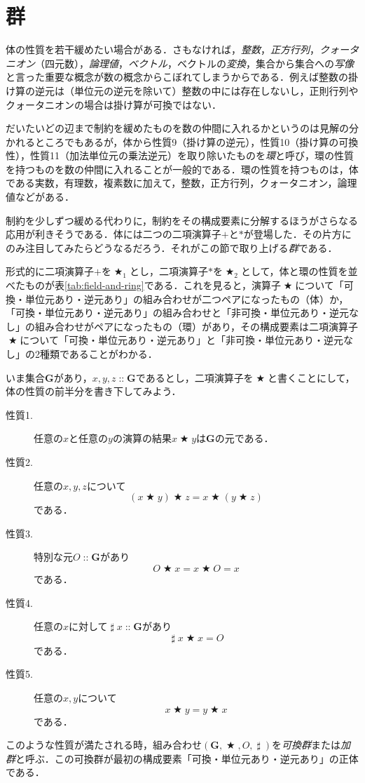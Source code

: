 \documentclass[twocolumn]{jsbook}
\newcommand{\keyword}[1]{{\emph{#1}}}
\DeclareMathOperator{\mathAnyBinaryOperator}{\bigstar}
\DeclareMathOperator{\mathInverse}{\sharp}
\DeclareMathOperator{\mathIn}{::}
\DeclareMathOperator{\mathInverse}{\neg}
\newcommand{\mathSet}[1]{\mathbf{#1}}
\newcommand{\mathGroup}[4]{(#1,#2,#3,#4)}
\begin{document}
\section{群}

体の性質を若干緩めたい場合がある．さもなければ，\keyword{整数}，\keyword{正方行列}，\keyword{クォータニオン}（四元数），\keyword{論理値}，\keyword{ベクトル}，ベクトルの\keyword{変換}，集合から集合への\keyword{写像}と言った重要な概念が数の概念からこぼれてしまうからである．例えば整数の掛け算の逆元は（単位元の逆元を除いて）整数の中には存在しないし，正則行列やクォータニオンの場合は掛け算が可換ではない．

だいたいどの辺まで制約を緩めたものを数の仲間に入れるかというのは見解の分かれるところでもあるが，体から性質9（掛け算の逆元），性質10（掛け算の可換性），性質11（加法単位元の乗法逆元）を取り除いたものを\keyword{環}と呼び，環の性質を持つものを数の仲間に入れることが一般的である．環の性質を持つものは，体である実数，有理数，複素数に加えて，整数，正方行列，クォータニオン，論理値などがある．

制約を少しずつ緩める代わりに，制約をその構成要素に分解するほうがさらなる応用が利きそうである．体には二つの二項演算子$+$と$*$が登場した．その片方にのみ注目してみたらどうなるだろう．それがこの節で取り上げる\keyword{群}である．

形式的に二項演算子$+$を$\mathAnyBinaryOperator_1$とし，二項演算子$*$を$\mathAnyBinaryOperator_2$として，体と環の性質を並べたものが表\ref{tab:field-and-ring}である．これを見ると，演算子$\mathAnyBinaryOperator$について「可換・単位元あり・逆元あり」の組み合わせが二つペアになったもの（体）か，「可換・単位元あり・逆元あり」の組み合わせと「非可換・単位元あり・逆元なし」の組み合わせがペアになったもの（環）があり，その構成要素は二項演算子$\mathAnyBinaryOperator$について「可換・単位元あり・逆元あり」と「非可換・単位元あり・逆元なし」の2種類であることがわかる．

いま集合$\mathSet{G}$があり，$x,y,z\mathIn\mathSet{G}$であるとし，二項演算子を$\mathAnyBinaryOperator$と書くことにして，体の性質の前半分を書き下してみよう．
\begin{description}
\item[性質1.] 任意の$x$と任意の$y$の演算の結果$x\mathAnyBinaryOperator y$は$\mathSet{G}$の元である．
\item[性質2.] 任意の$x,y,z$について$$(x\mathAnyBinaryOperator y)\mathAnyBinaryOperator z=x\mathAnyBinaryOperator(y\mathAnyBinaryOperator z)$$である．
\item[性質3.] 特別な元$O\mathIn\mathSet{G}$があり$$O\mathAnyBinaryOperator x=x\mathAnyBinaryOperator O=x$$である．
\item[性質4.] 任意の$x$に対して$\mathInverse x\mathIn\mathSet{G}$があり$$\mathInverse x\mathAnyBinaryOperator x=O$$である．
\item[性質5.] 任意の$x,y$について$$x\mathAnyBinaryOperator y=y\mathAnyBinaryOperator x$$である．
\end{description}
このような性質が満たされる時，組み合わせ$\mathGroup{\mathSet{G}}{\mathAnyBinaryOperator}{O}{\mathInverse}$を\keyword{可換群}または\keyword{加群}と呼ぶ．この可換群が最初の構成要素「可換・単位元あり・逆元あり」の正体である．
\end{document}
